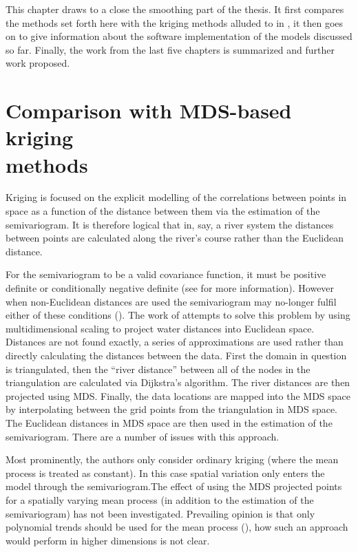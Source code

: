 \label{chap-fasend}

This chapter draws to a close the smoothing part of the thesis. It first compares the methods set forth here with the kriging methods alluded to in , it then goes on to give information about the software implementation of the models discussed so far. Finally, the work from the last five chapters is summarized and further work proposed.

\section{Comparison with MDS-based kriging\\methods}
\label{gds-krig}

Kriging is focused on the explicit modelling of the correlations between points in space as a function of the distance between them via the estimation of the semivariogram. It is therefore logical that in, say, a river system the distances between points are calculated along the river's course rather than the Euclidean distance. 

For the semivariogram to be a valid covariance function, it must be positive definite or conditionally negative definite (see  for more information). However when non-Euclidean distances are used the semivariogram may no-longer fulfil either of these conditions (\cite{curriero}). The work of  attempts to solve this problem by using multidimensional scaling to project water distances into Euclidean space. Distances are not found exactly, a series of approximations are used rather than directly calculating the distances between the data. First the domain in question is triangulated, then the ``river distance'' between all of the nodes in the triangulation are calculated via Dijkstra's algorithm. The river distances are then projected using MDS. Finally, the data locations are mapped into the MDS space by interpolating between the grid points from the triangulation in MDS space.  The Euclidean distances in MDS space are then used in the estimation of the semivariogram. There are a number of issues with this approach. 

Most prominently, the authors only consider ordinary kriging (where the mean process is treated as constant). In this case spatial variation only enters the model through the semivariogram.The effect of using the MDS projected points for a spatially varying mean process (in addition to the estimation of the semivariogram) has not been investigated. Prevailing opinion is that only polynomial trends should be used for the mean process (\cite[p. 57]{diggle}), how such an approach would perform in higher dimensions is not clear.

